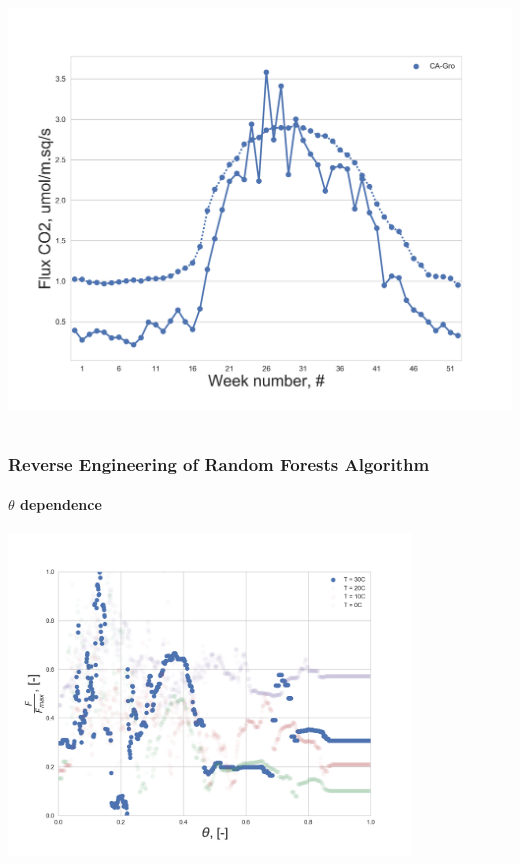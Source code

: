 \documentclass{beamer}
\begin{document}
\begin{frame}
\begin{columns}[t]
\includegraphics[width=\textwidth]{Reverse_engin_only_T/0.png}
\end{columns}

\end{frame}




\begin{frame}
\frametitle{Reverse Engineering of Random Forests Algorithm}
\framesubtitle{$\theta$ dependence}

\centering
\includegraphics[width=0.8\textwidth]{Theta_dependence_30.png}

\end{frame}
\end{document}
